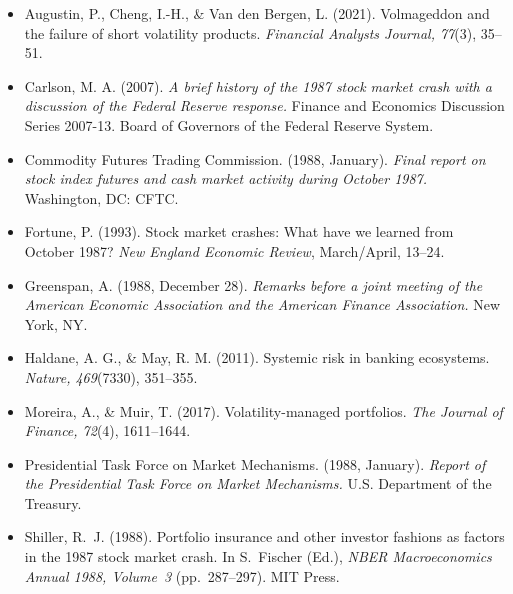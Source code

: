 \documentclass[12pt, a4paper]{article}
\begin{document}
\begin{itemize}[leftmargin=1.5em, itemsep=5pt, topsep=4pt]
  \item Augustin, P., Cheng, I.-H., \& Van den Bergen, L. (2021). Volmageddon and the
    failure of short volatility products. \textit{Financial Analysts Journal, 77}(3), 35--51.

  \item Carlson, M. A. (2007). \textit{A brief history of the 1987 stock market crash with
    a discussion of the Federal Reserve response.} Finance and Economics Discussion
    Series 2007-13. Board of Governors of the Federal Reserve System.

  \item Commodity Futures Trading Commission. (1988, January). \textit{Final report on
    stock index futures and cash market activity during October 1987.}
    Washington, DC: CFTC.

  \item Fortune, P. (1993). Stock market crashes: What have we learned from October 1987?
    \textit{New England Economic Review}, March/April, 13--24.

  \item Greenspan, A. (1988, December 28). \textit{Remarks before a joint meeting of
    the American Economic Association and the American Finance Association.}
    New York, NY.

  \item Haldane, A. G., \& May, R. M. (2011). Systemic risk in banking ecosystems.
    \textit{Nature, 469}(7330), 351--355.

  \item Moreira, A., \& Muir, T. (2017). Volatility-managed portfolios.
    \textit{The Journal of Finance, 72}(4), 1611--1644.

  \item Presidential Task Force on Market Mechanisms. (1988, January). \textit{Report
    of the Presidential Task Force on Market Mechanisms.} U.S. Department of the
    Treasury.

  \item Shiller, R.~J. (1988). Portfolio insurance and other investor fashions as
    factors in the 1987 stock market crash. In S.~Fischer (Ed.), \textit{NBER
    Macroeconomics Annual 1988, Volume~3} (pp.~287--297). MIT Press.
\end{itemize}
\end{document}
